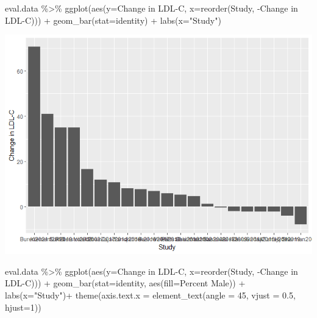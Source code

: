 \documentclass[
]{article}
\newenvironment{Shaded}{\begin{snugshade}}{\end{snugshade}}
\newcommand{\AttributeTok}[1]{\textcolor[rgb]{0.77,0.63,0.00}{#1}}
\newcommand{\DecValTok}[1]{\textcolor[rgb]{0.00,0.00,0.81}{#1}}
\newcommand{\FloatTok}[1]{\textcolor[rgb]{0.00,0.00,0.81}{#1}}
\newcommand{\FunctionTok}[1]{\textcolor[rgb]{0.00,0.00,0.00}{#1}}
\newcommand{\NormalTok}[1]{#1}
\newcommand{\SpecialCharTok}[1]{\textcolor[rgb]{0.00,0.00,0.00}{#1}}
\newcommand{\StringTok}[1]{\textcolor[rgb]{0.31,0.60,0.02}{#1}}
\begin{document}
\begin{Shaded}
\begin{Highlighting}[]
\NormalTok{eval.data }\SpecialCharTok{\%\textgreater{}\%}
  \FunctionTok{ggplot}\NormalTok{(}\FunctionTok{aes}\NormalTok{(}\AttributeTok{y=}\StringTok{\textasciigrave{}}\AttributeTok{Change in LDL{-}C}\StringTok{\textasciigrave{}}\NormalTok{,}
             \AttributeTok{x=}\FunctionTok{reorder}\NormalTok{(Study, }\SpecialCharTok{{-}}\StringTok{\textasciigrave{}}\AttributeTok{Change in LDL{-}C}\StringTok{\textasciigrave{}}\NormalTok{))) }\SpecialCharTok{+}
  \FunctionTok{geom\_bar}\NormalTok{(}\AttributeTok{stat=}\StringTok{\textquotesingle{}identity\textquotesingle{}}\NormalTok{) }\SpecialCharTok{+}
  \FunctionTok{labs}\NormalTok{(}\AttributeTok{x=}\StringTok{"Study"}\NormalTok{)}
\end{Highlighting}
\end{Shaded}

\includegraphics{figures/ldl-change-1.png}

\begin{Shaded}
\begin{Highlighting}[]
\NormalTok{eval.data }\SpecialCharTok{\%\textgreater{}\%}
  \FunctionTok{ggplot}\NormalTok{(}\FunctionTok{aes}\NormalTok{(}\AttributeTok{y=}\StringTok{\textasciigrave{}}\AttributeTok{Change in LDL{-}C}\StringTok{\textasciigrave{}}\NormalTok{,}
             \AttributeTok{x=}\FunctionTok{reorder}\NormalTok{(Study, }\SpecialCharTok{{-}}\StringTok{\textasciigrave{}}\AttributeTok{Change in LDL{-}C}\StringTok{\textasciigrave{}}\NormalTok{))) }\SpecialCharTok{+}
  \FunctionTok{geom\_bar}\NormalTok{(}\AttributeTok{stat=}\StringTok{\textquotesingle{}identity\textquotesingle{}}\NormalTok{, }\FunctionTok{aes}\NormalTok{(}\AttributeTok{fill=}\StringTok{\textasciigrave{}}\AttributeTok{Percent Male}\StringTok{\textasciigrave{}}\NormalTok{)) }\SpecialCharTok{+}
  \FunctionTok{labs}\NormalTok{(}\AttributeTok{x=}\StringTok{"Study"}\NormalTok{)}\SpecialCharTok{+}
    \FunctionTok{theme}\NormalTok{(}\AttributeTok{axis.text.x =} \FunctionTok{element\_text}\NormalTok{(}\AttributeTok{angle =} \DecValTok{45}\NormalTok{, }\AttributeTok{vjust =} \FloatTok{0.5}\NormalTok{, }\AttributeTok{hjust=}\DecValTok{1}\NormalTok{))}
\end{Highlighting}
\end{Shaded}
\end{document}
